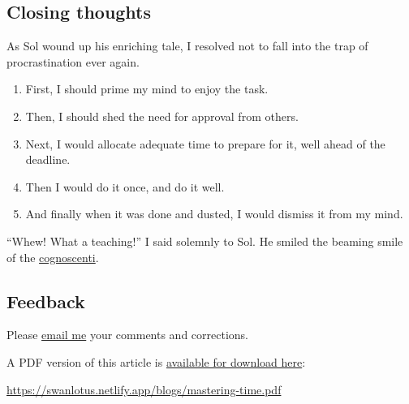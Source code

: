 \documentclass[
  a4paper,
]{article}
\providecommand{\tightlist}{%
  \setlength{\itemsep}{0pt}\setlength{\parskip}{0pt}}
\begin{document}
\hypertarget{closing-thoughts}{%
\subsection{Closing thoughts}\label{closing-thoughts}}

As Sol wound up his enriching tale, I resolved not to fall into the trap
of procrastination ever again.

\begin{enumerate}
\tightlist
\item
  First, I should prime my mind to enjoy the task.
\item
  Then, I should shed the need for approval from others.
\item
  Next, I would allocate adequate time to prepare for it, well ahead of
  the deadline.
\item
  Then I would do it once, and do it well.
\item
  And finally when it was done and dusted, I would dismiss it from my
  mind.
\end{enumerate}

``Whew! What a teaching!'' I said solemnly to Sol. He smiled the beaming
smile of the
\href{https://www.dictionary.com/browse/cognoscenti}{cognoscenti}.

\hypertarget{feedback}{%
\subsection{Feedback}\label{feedback}}

Please \href{mailto:feedback.swanlotus@gmail.com}{email me} your
comments and corrections.

\noindent A PDF version of this article is
\href{./mastering-time.pdf}{available for download here}:

\begin{small}

\begin{sffamily}

\url{https://swanlotus.netlify.app/blogs/mastering-time.pdf}

\end{sffamily}

\end{small}
\end{document}
